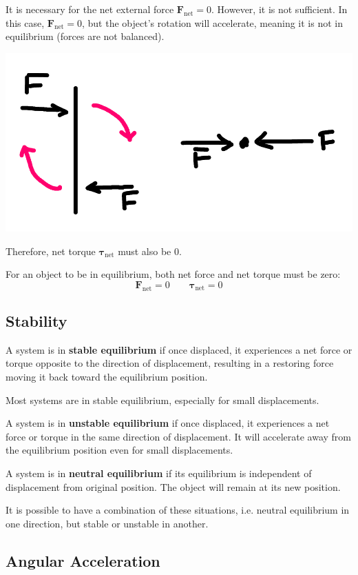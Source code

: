 \documentclass{article}
\newcommand{\definition}[1]{\begin{tcolorbox}[colback=red!5!white,colframe=red!75!black,parbox=false] #1 \end{tcolorbox}}
\newcommand{\theorem}[2]{\begin{tcolorbox}[title={#1},colback=blue!5!white,colframe=blue!75!black,parbox=false] #2 \end{tcolorbox}}
\begin{document}
It is necessary for the net external force $\mathbf{F}_\text{net}=0$. However, it is not sufficient. In this case, $\mathbf{F}_\text{net}=0$, but the object's rotation will accelerate, meaning it is not in equilibrium (forces are not balanced).
\begin{center}
	\includegraphics[width=0.5\linewidth]{notequilibrium.png}
\end{center}

Therefore, net torque $\boldsymbol{\tau}_\text{net}$ must also be $0$.

\theorem*{For an object to be in equilibrium, both net force and net torque must be zero:
\begin{equation*}
	\mathbf{F}_ \text{net}=0 \qquad \boldsymbol{\tau}_\text{net}=0
\end{equation*}}

\subsection{Stability}

\definition{A system is in \textbf{stable equilibrium} if once displaced, it experiences a net force or torque opposite to the direction of displacement, resulting in a restoring force moving it back toward the equilibrium position.}

Most systems are in stable equilibrium, especially for small displacements.

\definition{A system is in \textbf{unstable equilibrium} if once displaced, it experiences a net force or torque in the same direction of displacement. It will accelerate away from the equilibrium position even for small displacements.}

\definition{A system is in \textbf{neutral equilibrium} if its equilibrium is independent of displacement from original position. The object will remain at its new position.}

It is possible to have a combination of these situations, i.e. neutral equilibrium in one direction, but stable or unstable in another.

\subsection{Angular Acceleration}
\end{document}
